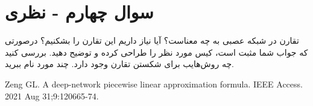 \section{سوال چهارم - نظری}

تقارن در شبکه عصبی به چه معناست؟ آیا نیاز داریم این تقارن را بشکنیم؟ درصورتی که جواب شما مثبت است، کیس مورد نظر را طراحی کرده و توضیح دهید. بررسی کنید چه روش‌هایب برای شکستن تقارن وجود دارد. چند مورد نام ببرید.























\begin{latin}
	\begin{thebibliography}{9}
		
		
		Zeng GL. A deep-network piecewise linear approximation formula. IEEE Access. 2021 Aug 31;9:120665-74.
	\end{thebibliography} 
\end{latin}